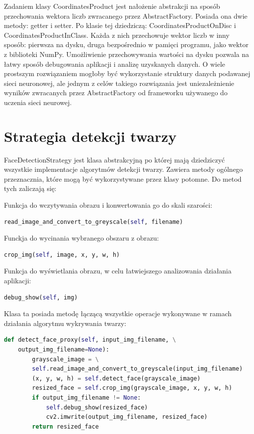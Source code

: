 \documentclass[oneside, eng]{mgr}
\begin{document}
Zadaniem klasy CoordinatesProduct jest nałożenie abstrakcji na sposób przechowania wektora liczb zwracanego przez AbstractFactory. Posiada ona dwie metody: getter i setter. Po klasie tej dziedziczą: CoordinatesProductOnDisc i CoordinatesProductInClass. Każda z nich przechowuje wektor liczb w inny sposób: pierwsza na dysku, druga bezpośrednio w pamięci programu, jako wektor z biblioteki NumPy. Umożliwienie przechowywania wartości na dysku pozwala na łatwy sposób debugowania aplikacji i analizę uzyskanych danych. O wiele prostszym rozwiązaniem mogłoby być wykorzystanie struktury danych podawanej sieci neuronowej, ale jednym z celów takiego rozwiązania jest uniezależnienie wyników zwracanych przez AbstractFactory od frameworku używanego do uczenia sieci neurowej.

\section{Strategia detekcji twarzy}

FaceDetectionStrategy jest klasa abstrakcyjną po której mają dziedziczyć wszystkie implementacje algorytmów detekcji twarzy. Zawiera metody ogólnego przeznacznia, które mogą być wykorzystywane przez klasy potomne. Do metod tych zaliczają się:

Funkcja do wczytywania obrazu i konwertowania go do skali szarości:

\begin{lstlisting}[language=Python]
	read_image_and_convert_to_greyscale(self, filename)
\end{lstlisting}

Funckja do wycinania wybranego obszaru z obrazu:

\begin{lstlisting}[language=Python]
	crop_img(self, image, x, y, w, h)
\end{lstlisting}

Funkcja do wyświetlania obrazu, w celu łatwiejszego analizowania działania aplikacji:

\begin{lstlisting}[language=Python]
	debug_show(self, img)
\end{lstlisting}

Klasa ta posiada metodę łączącą wszystkie operacje wykonywane w ramach działania algorytmu wykrywania twarzy:

\begin{lstlisting}[language=Python]
    def detect_face_proxy(self, input_img_filename, \
    output_img_filename=None):
        grayscale_image = \
        self.read_image_and_convert_to_greyscale(input_img_filename)
        (x, y, w, h) = self.detect_face(grayscale_image)
        resized_face = self.crop_img(grayscale_image, x, y, w, h)
        if output_img_filename != None:
        	self.debug_show(resized_face)
            cv2.imwrite(output_img_filename, resized_face)
        return resized_face
\end{lstlisting}
\end{document}
